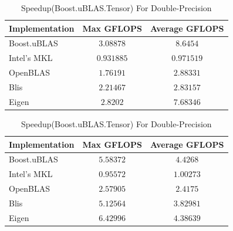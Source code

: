 \begin{table}[ht]
    \centering
    \caption{Speedup(Boost.uBLAS.Tensor) For Single-Precision}
    \begin{tabular}{|l|c|c|}
        \hline
        \textbf{Implementation} & \textbf{Max GFLOPS} & \textbf{Average GFLOPS}\\
        \hline
        Boost.uBLAS         & $3.08878$ & $8.6454$ \\
        \hline
        Intel's MKL         & $0.931885$ & $0.971519$ \\
        \hline
        OpenBLAS            & $1.76191$ & $2.88331$ \\
        \hline
        Blis                & $2.21467$ & $2.83157$ \\
        \hline
        Eigen               & $2.8202$ & $7.68346$ \\
        \hline
    \end{tabular}

    \vspace*{1 cm}

    \centering
    \caption{Speedup(Boost.uBLAS.Tensor) For Double-Precision}
    \begin{tabular}{|l|c|c|}
        \hline
        \textbf{Implementation} & \textbf{Max GFLOPS} & \textbf{Average GFLOPS}\\
        \hline
        Boost.uBLAS         & $5.58372$ & $4.4268$ \\
        \hline
        Intel's MKL         & $0.95572$ & $1.00273$ \\
        \hline
        OpenBLAS            & $2.57905$ & $2.4175$ \\
        \hline
        Blis                & $5.12564$ & $3.82981$ \\
        \hline
        Eigen               & $6.42996$ & $4.38639$ \\
        \hline
    \end{tabular}
\end{table}

